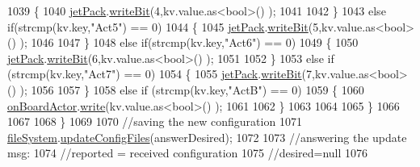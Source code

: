 \begin{DoxyCode}
1039                     \{
1040                         \hyperlink{class_cool_board_a30b1357881b01ccbec676856a91e48e9}{jetPack}.\hyperlink{class_jetpack_a79ae7bc3c1828a0551a7c005c4f8bd00}{writeBit}(4,kv.value.as<\textcolor{keywordtype}{bool}>() ); 
1041 
1042                     \}
1043                     \textcolor{keywordflow}{else} \textcolor{keywordflow}{if}(strcmp(kv.key,\textcolor{stringliteral}{"Act5"}) == 0)
1044                     \{
1045                         \hyperlink{class_cool_board_a30b1357881b01ccbec676856a91e48e9}{jetPack}.\hyperlink{class_jetpack_a79ae7bc3c1828a0551a7c005c4f8bd00}{writeBit}(5,kv.value.as<\textcolor{keywordtype}{bool}>() ); 
1046 
1047                     \}
1048                     \textcolor{keywordflow}{else} \textcolor{keywordflow}{if}(strcmp(kv.key,\textcolor{stringliteral}{"Act6"}) == 0)
1049                     \{
1050                         \hyperlink{class_cool_board_a30b1357881b01ccbec676856a91e48e9}{jetPack}.\hyperlink{class_jetpack_a79ae7bc3c1828a0551a7c005c4f8bd00}{writeBit}(6,kv.value.as<\textcolor{keywordtype}{bool}>() ); 
1051 
1052                     \}
1053                     \textcolor{keywordflow}{else} \textcolor{keywordflow}{if} (strcmp(kv.key,\textcolor{stringliteral}{"Act7"}) == 0)
1054                     \{
1055                         \hyperlink{class_cool_board_a30b1357881b01ccbec676856a91e48e9}{jetPack}.\hyperlink{class_jetpack_a79ae7bc3c1828a0551a7c005c4f8bd00}{writeBit}(7,kv.value.as<\textcolor{keywordtype}{bool}>() ); 
1056 
1057                     \}
1058                     \textcolor{keywordflow}{else} \textcolor{keywordflow}{if} (strcmp(kv.key,\textcolor{stringliteral}{"ActB"}) == 0)
1059                     \{
1060                         \hyperlink{class_cool_board_a4ac693895c21025b8808653f2a4316e6}{onBoardActor}.\hyperlink{class_cool_board_actor_a958786ff01ea1056ee72c72d439f86da}{write}(kv.value.as<\textcolor{keywordtype}{bool}>() ); 
1061 
1062                     \}
1063                                 
1064                 
1065                 \}
1066 
1067                 
1068             \}
1069 
1070             \textcolor{comment}{//saving the new configuration}
1071             \hyperlink{class_cool_board_a42c2586fbb13ff7f06538e9284e8538d}{fileSystem}.\hyperlink{class_cool_file_system_adfa8e2e80641ae6f0cceabd348a9b841}{updateConfigFiles}(answerDesired);
1072 
1073                 \textcolor{comment}{//answering the update msg:}
1074             \textcolor{comment}{//reported = received configuration}
1075             \textcolor{comment}{//desired=null}
1076         

\end{DoxyCode}
